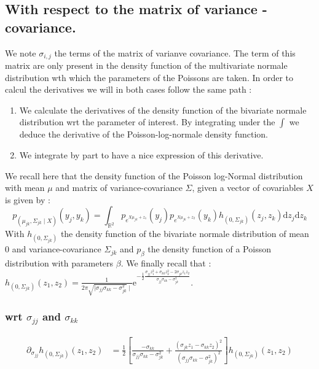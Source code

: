 \documentclass[11pt, a4paper]{article}
\begin{document}
\subsection{With respect to the matrix of variance - covariance.}
We note $\sigma_{i,j}$ the terms of the matrix of varianve covariance. The term of this matrix are only present in the density function of the multivariate normale distribution wth which the parameters of the Poissons are taken. In order to calcul the derivatives we will in both cases follow the same path :
\begin{enumerate}
\item We calculate the derivatives of the density function of the bivariate normale distribution wrt the parameter of interest. By integrating under the $\int$ we deduce the derivative of the Poisson-log-normale density function.
\item We integrate by part to have a nice expression of this derivative.
\end{enumerate}
We recall here that the density function of the Poisson log-Normal distribution with mean $\mu$ and matrix of variance-covariance $\Sigma$, given a vector of covariables $X$ is given by :
\begin{equation*}
p_{(\mu_{jk},\Sigma_{jk} \mid X)}(y_j,y_k)=\int_{\mathbb{R}^2} p_{e^{X\mu_{jk}+z_1}}(y_j) p_{e^{X\mu_{jk}+z_2}}(y_k) h_{(0,\Sigma_{jk})}(z_j,z_k) \mathrm{d}z_j \mathrm{d}z_k
\end{equation*}
With $h_{(0,\Sigma_{jk})}$ the density function of the bivariate normale distribution of mean $0$ and variance-covariance $\Sigma_{jk}$ and $p_{\beta}$ the density function of a Poisson distribution with parameters $\beta$.
We finally recall that : $h_{(0,\Sigma_{jk})}(z_1,z_2)=\frac{1}{2 \pi \sqrt{\mid \sigma_{jj} \sigma_{kk}-\sigma_{jk}^2}\mid} \mathrm{e}^{-\frac{1}{2} \frac{\sigma_{jj} z_1^2 + \sigma_{kk} z_2^2 -2 \sigma_{jk} z_1 z_2}{\sigma_{jj} \sigma_{kk}-\sigma_{jk}^2}}$.

\subsubsection{wrt $\sigma_{jj}$ and $\sigma_{kk}$}
\begin{align*}
\partial_{\sigma_{jj}} h_{(0,\Sigma_{jk})} (z_1,z_2) &= \frac{1}{2} [ \frac{-\sigma_{kk}}{\sigma_{jj} \sigma_{kk}-\sigma_{jk}^2} +  \frac{(\sigma_{jk} z_1 - \sigma_{kk} z_2)^2}{(\sigma_{jj} \sigma_{kk}-\sigma_{jk}^2)^2}  ]h_{(0,\Sigma_{jk})}(z_1,z_2)
\end{align*}
\end{document}
